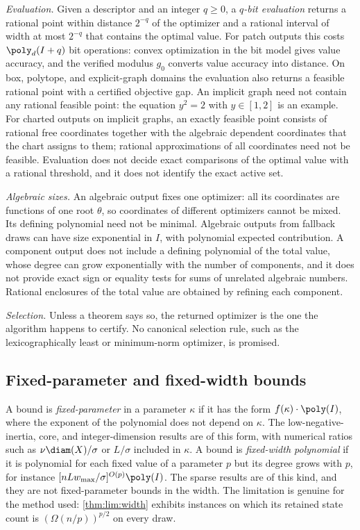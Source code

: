 \emph{Evaluation.} Given a descriptor and an integer $q\ge0$, a
\emph{$q$-bit evaluation} returns a rational point within distance $2^{-q}$
of the optimizer and a rational interval of width at most $2^{-q}$ that
contains the optimal value. For patch outputs this costs $\poly_d(I+q)$ bit
operations: convex optimization in the bit model gives value accuracy, and
the verified modulus $g_0$ converts value accuracy into distance. On box,
polytope, and explicit-graph domains the evaluation also returns a feasible
rational point with a certified objective gap. An implicit graph need not
contain any rational feasible point: the equation $y^2=2$ with $y\in[1,2]$
is an example. For charted outputs on implicit graphs, an exactly feasible
point consists of rational free coordinates together with the algebraic
dependent coordinates that the chart assigns to them; rational
approximations of all coordinates need not be feasible. Evaluation does not
decide exact comparisons of the optimal value with a rational threshold,
and it does not identify the exact active set.

\emph{Algebraic sizes.} An algebraic output fixes one optimizer: all its
coordinates are functions of one root $\theta$, so coordinates of different
optimizers cannot be mixed. Its defining polynomial need not be minimal.
Algebraic outputs from fallback draws can have size exponential in $I$, with
polynomial expected contribution. A component output does not include a
defining polynomial of the total value, whose degree can grow exponentially
with the number of components, and it does not provide exact sign or
equality tests for sums of unrelated algebraic numbers. Rational
enclosures of the total value are obtained by refining each component.

\emph{Selection.} Unless a theorem says so, the returned optimizer is the
one the algorithm happens to certify. No canonical selection rule, such as
the lexicographically least or minimum-norm optimizer, is promised.

\subsection{Fixed-parameter and fixed-width bounds}\label{sec:model:parameters}

A bound is \emph{fixed-parameter} in a parameter $\kappa$ if it has the form
$f(\kappa)\cdot\poly(I)$, where the exponent of the polynomial does not
depend on $\kappa$. The low-negative-inertia, core, and integer-dimension
results are of this form, with numerical ratios such as
$\nu\diam(X)/\sigma$ or $L/\sigma$ included in $\kappa$. A bound is
\emph{fixed-width polynomial} if it is polynomial for each fixed value of a
parameter $p$ but its degree grows with $p$, for instance
$[nLw_{\max}/\sigma]^{O(p)}\poly(I)$. The sparse results are of this kind,
and they are not fixed-parameter bounds in the width. The limitation is
genuine for the method used: \cref{thm:lim:width} exhibits instances on
which its retained state count is $(\Omega(n/p))^{p/2}$ on every draw.


